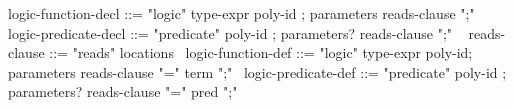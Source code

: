 \begin{syntax}
  { logic-function-decl } ::= { "logic" type-expr poly-id };
  { parameters reads-clause ";" }
  \
  { logic-predicate-decl } ::= { "predicate" poly-id };
  { parameters? reads-clause ";" }
  \
  { reads-clause } ::= { "reads" locations }
  \
  logic-function-def ::= "logic" type-expr poly-id;
                         parameters { reads-clause } "=" term ";"
  \
  logic-predicate-def ::= "predicate" poly-id ;
  parameters? { reads-clause } "=" pred ";"
\end{syntax}
